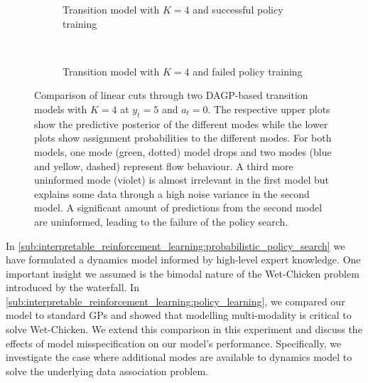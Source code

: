 \begin{figure}[tp]
    \centering
    \begin{subfigure}[t]{\linewidth}
        \centering
        
        
        \caption{
          \label{fig:interpretable_reinforcement_learning:wetchicken:good_cut}
          Transition model with $K=4$ and successful policy training
        }
    \end{subfigure}\\[\figureskip]
    \begin{subfigure}[t]{\linewidth}
        \centering
        
        
        \caption{
          \label{fig:interpretable_reinforcement_learning:wetchicken:bad_cut}
          Transition model with $K=4$ and failed policy training
        }
    \end{subfigure}
    \caption{
      \label{fig:interpretable_reinforcement_learning:wetchicken:cut_comparison}
      Comparison of linear cuts through two DAGP-based transition models with $K=4$ at $y_t = 5$ and $a_t=0$.
      The respective upper plots show the predictive posterior of the different modes while the lower plots show assignment probabilities to the different modes.
      For both models, one mode (green, dotted) model drops and two modes (blue and yellow, dashed) represent flow behaviour.
      A third more uninformed mode (violet) is almost irrelevant in the first model but explains some data through a high noise variance in the second model.
      A significant amount of predictions from the second model are uninformed, leading to the failure of the policy search.
    }
\end{figure}
In \cref{sub:interpretable_reinforcement_learning:probabilistic_policy_search} we have formulated a dynamics model informed by high-level expert knowledge.
One important insight we assumed is the bimodal nature of the Wet-Chicken problem introduced by the waterfall.
In \cref{sub:interpretable_reinforcement_learning:policy_learning}, we compared our model to standard GPs and showed that modelling multi-modality is critical to solve Wet-Chicken.
We extend this comparison in this experiment and discuss the effects of model misspecification on our model's performance.
Specifically, we investigate the case where additional modes are available to dynamics model to solve the underlying data association problem.

